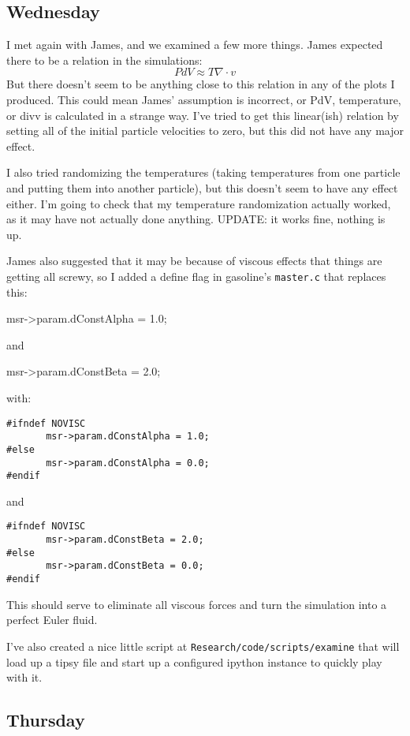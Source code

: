 \documentclass[11pt,letterpaper]{article}
\begin{document}
\subsection{Wednesday}

I met again with James, and we examined a few more things. James
expected there to be a relation in the simulations:
\[PdV \approx T\nabla\cdot v\] But there doesn't seem to be anything
close to this relation in any of the plots I produced. This could mean
James' assumption is incorrect, or PdV, temperature, or divv is
calculated in a strange way. I've tried to get this linear(ish) relation
by setting all of the initial particle velocities to zero, but this did
not have any major effect.

I also tried randomizing the temperatures (taking temperatures from one
particle and putting them into another particle), but this doesn't seem
to have any effect either. I'm going to check that my temperature
randomization actually worked, as it may have not actually done
anything. UPDATE: it works fine, nothing is up.

James also suggested that it may be because of viscous effects that
things are getting all screwy, so I added a define flag in gasoline's
\texttt{master.c} that replaces this:

msr-\textgreater{}param.dConstAlpha = 1.0;

and

msr-\textgreater{}param.dConstBeta = 2.0;

with:

\begin{verbatim}
#ifndef NOVISC
       msr->param.dConstAlpha = 1.0;
#else
       msr->param.dConstAlpha = 0.0;
#endif
\end{verbatim}

and

\begin{verbatim}
#ifndef NOVISC
       msr->param.dConstBeta = 2.0;
#else
       msr->param.dConstBeta = 0.0;
#endif
\end{verbatim}

This should serve to eliminate all viscous forces and turn the
simulation into a perfect Euler fluid.

I've also created a nice little script at
\texttt{Research/code/scripts/examine} that will load up a tipsy file
and start up a configured ipython instance to quickly play with it.

\subsection{Thursday}
\end{document}
